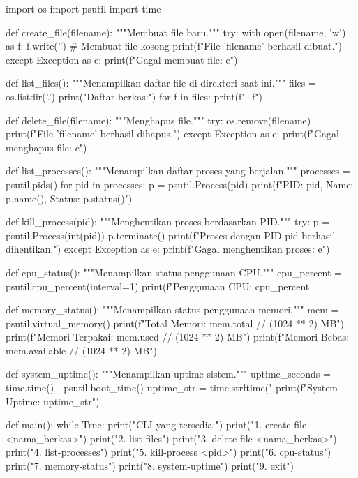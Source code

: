 \documentclass[12pt]{article}
\begin{document}
\begin{python}
    import os
import psutil
import time

def create_file(filename):
    """Membuat file baru."""
    try:
        with open(filename, 'w') as f:
            f.write('')  # Membuat file kosong
        print(f"File '{filename}' berhasil dibuat.")
    except Exception as e:
        print(f"Gagal membuat file: {e}")

def list_files():
    """Menampilkan daftar file di direktori saat ini."""
    files = os.listdir('.')
    print("Daftar berkas:")
    for f in files:
        print(f"- {f}")

def delete_file(filename):
    """Menghapus file."""
    try:
        os.remove(filename)
        print(f"File '{filename}' berhasil dihapus.")
    except Exception as e:
        print(f"Gagal menghapus file: {e}")

def list_processes():
    """Menampilkan daftar proses yang berjalan."""
    processes = psutil.pids()
    for pid in processes:
        p = psutil.Process(pid)
        print(f"PID: {pid}, Name: {p.name()}, Status: {p.status()}")

def kill_process(pid):
    """Menghentikan proses berdasarkan PID."""
    try:
        p = psutil.Process(int(pid))
        p.terminate()
        print(f"Proses dengan PID {pid} berhasil dihentikan.")
    except Exception as e:
        print(f"Gagal menghentikan proses: {e}")

def cpu_status():
    """Menampilkan status penggunaan CPU."""
    cpu_percent = psutil.cpu_percent(interval=1)
    print(f"Penggunaan CPU: {cpu_percent}%

def memory_status():
    """Menampilkan status penggunaan memori."""
    mem = psutil.virtual_memory()
    print(f"Total Memori: {mem.total // (1024 ** 2)} MB")
    print(f"Memori Terpakai: {mem.used // (1024 ** 2)} MB")
    print(f"Memori Bebas: {mem.available // (1024 ** 2)} MB")

def system_uptime():
    """Menampilkan uptime sistem."""
    uptime_seconds = time.time() - psutil.boot_time()
    uptime_str = time.strftime("%
    print(f"System Uptime: {uptime_str}")

def main():
    while True:
        print("\nPerintah CLI yang tersedia:")
        print("1. create-file <nama_berkas>")
        print("2. list-files")
        print("3. delete-file <nama_berkas>")
        print("4. list-processes")
        print("5. kill-process <pid>")
        print("6. cpu-status")
        print("7. memory-status")
        print("8. system-uptime")
        print("9. exit")


\end{python}
\end{document}
